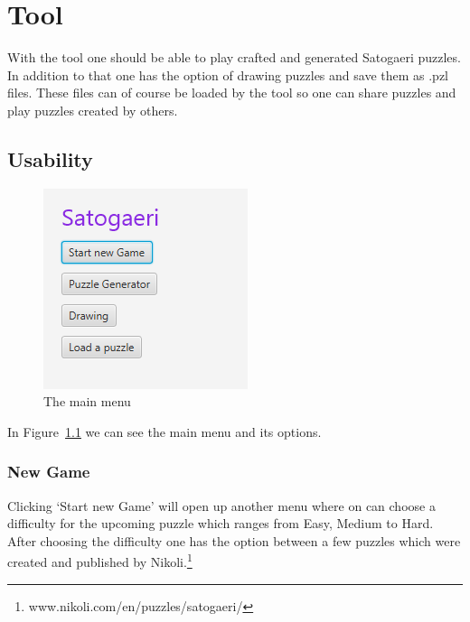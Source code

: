 \chapter{Tool} \label{The Tool}
With the tool one should be able to play crafted and generated Satogaeri puzzles. In addition to that one has the option of drawing puzzles and save them as .pzl files. These files can of course be loaded by the tool so one can share puzzles and play puzzles created by others.

\section{Usability}
\begin{figure}
  \centering
  \includegraphics[scale=1]{Pictures/main_menu.png} 
  \caption{The main menu}
  \label{fig:main_menu}
\end{figure}
In Figure~\ref{fig:main_menu} we can see the main menu and its options.

\subsection{New Game} Clicking `Start new Game' will open up another menu where on can choose a difficulty for the upcoming puzzle which ranges from Easy, Medium to Hard. After choosing the difficulty one has the option between a few puzzles which were created and published by Nikoli.\footnote{www.nikoli.com/en/puzzles/satogaeri/}

